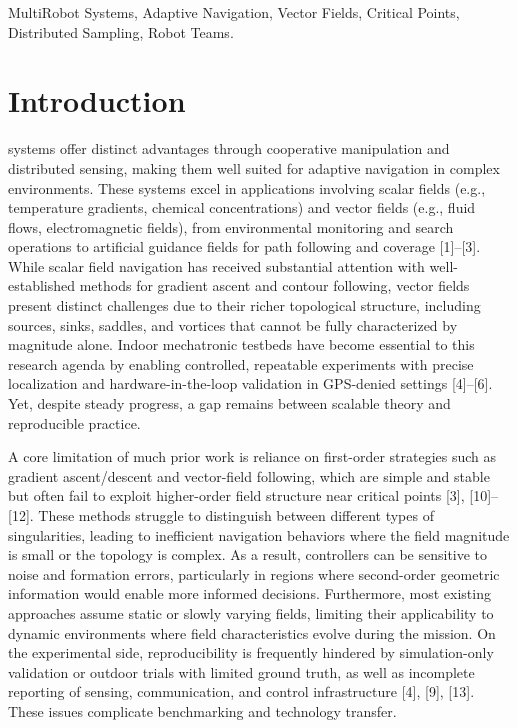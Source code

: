 \documentclass[lettersize,journal]{IEEEtran}
\begin{document}
\begin{IEEEkeywords}
MultiRobot Systems, Adaptive Navigation, Vector Fields, Critical Points, Distributed Sampling, Robot Teams.
\end{IEEEkeywords}


\section{Introduction}
 systems offer distinct advantages through cooperative manipulation and distributed sensing, making them well suited for adaptive navigation in complex environments. These systems excel in applications involving scalar fields (e.g., temperature gradients, chemical concentrations) and vector fields (e.g., fluid flows, electromagnetic fields), from environmental monitoring and search operations to artificial guidance fields for path following and coverage [1]–[3]. While scalar field navigation has received substantial attention with well-established methods for gradient ascent and contour following, vector fields present distinct challenges due to their richer topological structure, including sources, sinks, saddles, and vortices that cannot be fully characterized by magnitude alone. Indoor mechatronic testbeds have become essential to this research agenda by enabling controlled, repeatable experiments with precise localization and hardware-in-the-loop validation in GPS-denied settings [4]–[6]. Yet, despite steady progress, a gap remains between scalable theory and reproducible practice.

A core limitation of much prior work is reliance on first-order strategies such as gradient ascent/descent and vector-field following, which are simple and stable but often fail to exploit higher-order field structure near critical points [3], [10]–[12]. These methods struggle to distinguish between different types of singularities, leading to inefficient navigation behaviors where the field magnitude is small or the topology is complex. As a result, controllers can be sensitive to noise and formation errors, particularly in regions where second-order geometric information would enable more informed decisions. Furthermore, most existing approaches assume static or slowly varying fields, limiting their applicability to dynamic environments where field characteristics evolve during the mission. On the experimental side, reproducibility is frequently hindered by simulation-only validation or outdoor trials with limited ground truth, as well as incomplete reporting of sensing, communication, and control infrastructure [4], [9], [13]. These issues complicate benchmarking and technology transfer.
\end{document}
